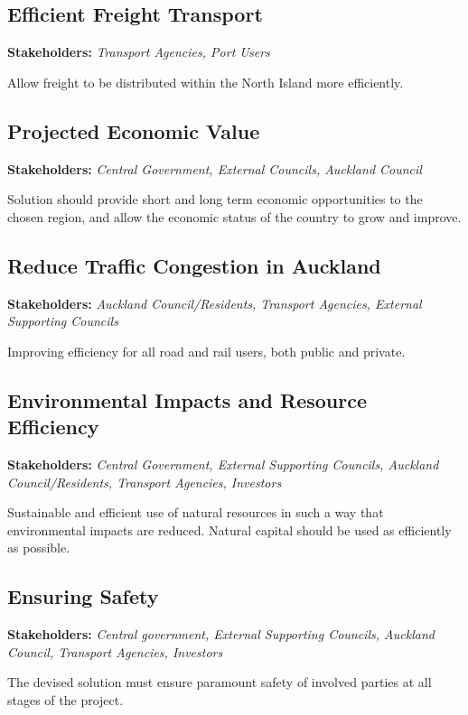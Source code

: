 \begin{multicols}{2}
\subsection*{Efficient Freight Transport}
    \begin{flushleft}
        \textbf{Stakeholders: }\textit{Transport Agencies, Port Users}
    \end{flushleft}
    \vspace{-3mm}
    Allow freight to be distributed within the North Island more efficiently.
\subsection*{Projected Economic Value}
    \begin{flushleft}
        \textbf{Stakeholders: }\textit{Central Government, External Councils, Auckland Council}
    \end{flushleft}
    \vspace{-3mm}
    Solution should provide short and long term economic opportunities to the chosen region, and allow the economic status of the country to grow and improve. 
\subsection*{Reduce Traffic Congestion in Auckland}
    \begin{flushleft}
        \textbf{Stakeholders: }\textit{Auckland Council/Residents, Transport Agencies, External Supporting Councils}
    \end{flushleft}
    \vspace{-3mm}
    Improving efficiency for all road and rail users, both public and private. 
\subsection*{Environmental Impacts and Resource Efficiency}
    \begin{flushleft}
        \textbf{Stakeholders: }\textit{Central Government, External Supporting Councils, Auckland Council/Residents, Transport Agencies, Investors}
    \end{flushleft}
    \vspace{-3mm}
    Sustainable and efficient use of natural resources in such a way that environmental impacts are reduced. Natural capital should be used as efficiently as possible.
\subsection*{Ensuring Safety}
    \begin{flushleft}
        \textbf{Stakeholders: }\textit{Central government, External Supporting Councils, Auckland Council, Transport Agencies, Investors}
    \end{flushleft}
    \vspace{-3mm}
    The devised solution must ensure paramount safety of involved parties at all stages of the project. 

\end{multicols}

